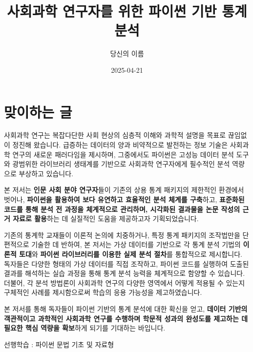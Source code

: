 \documentclass[
  letterpaper,
]{book}
\title{사회과학 연구자를 위한 파이썬 기반 통계 분석}
\author{당신의 이름}
\date{2025-04-21}
\renewcommand*\contentsname{Table of contents}
\newcommand\contentsname{Table of contents}
\begin{document}
\frontmatter
\maketitle

\renewcommand*\contentsname{Table of contents}
{
\setcounter{tocdepth}{2}
\tableofcontents
}

\mainmatter
{}

\chapter*{맞이하는 글}\label{uxb9deuxc774uxd558uxb294-uxae00}


사회과학 연구는 복잡다단한 사회 현상의 심층적 이해와 과학적 설명을
목표로 끊임없이 정진해 왔습니다. 급증하는 데이터의 양과 비약적으로
발전하는 정보 기술은 사회과학 연구의 새로운 패러다임을 제시하며,
그중에서도 파이썬은 고성능 데이터 분석 도구와 광범위한 라이브러리
생태계를 기반으로 사회과학 연구자에게 필수적인 분석 역량으로 부상하고
있습니다.

본 저서는 \textbf{인문 사회 분야 연구자}들이 기존의 상용 통계 패키지의
제한적인 환경에서 벗어나, \textbf{파이썬을 활용하여 보다 유연하고
효율적인 분석 체계를 구축}하고, \textbf{표준화된 코드를 통해 분석 전
과정을 체계적으로 관리하며, 시각화된 결과물을 논문 작성의 근거 자료로
활용}하는 데 실질적인 도움을 제공하고자 기획되었습니다.

기존의 통계학 교재들이 이론적 논의에 치중하거나, 특정 통계 패키지의
조작법만을 단편적으로 기술한 데 반하여, 본 저서는 가상 데이터를 기반으로
각 통계 분석 기법의 \textbf{이론적 토대}와 \textbf{파이썬 라이브러리를
이용한 실제 분석 절차}를 통합적으로 제시합니다. 독자들은 다양한 형태의
가상 데이터를 직접 조작하고, 파이썬 코드를 실행하여 도출된 결과를
해석하는 실습 과정을 통해 통계 분석 능력을 체계적으로 함양할 수
있습니다. 더불어, 각 분석 방법론이 사회과학 연구의 다양한 영역에서
어떻게 적용될 수 있는지 구체적인 사례를 제시함으로써 학습의 응용
가능성을 제고하였습니다.

본 저서를 통해 독자들이 파이썬 기반의 통계 분석에 대한 확신을 얻고,
\textbf{데이터 기반의 객관적이고 과학적인 사회과학 연구를 수행하며
학문적 성과의 완성도를 제고하는 데 필요한 핵심 역량을 확보}하게 되기를
기대하는 바입니다.

선행학습 : 파이썬 문법 기초 및 자료형

\end{document}
